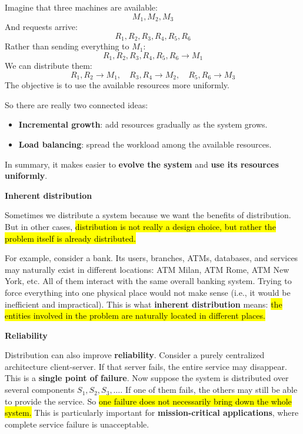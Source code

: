 \highspace
Imagine that three machines are available:
\begin{equation*}
    M_1, M_2, M_3
\end{equation*}
And requests arrive:
\begin{equation*}
    R_1, R_2, R_3, R_4, R_5, R_6
\end{equation*}
Rather than sending everything to $M_1$:
\begin{equation*}
    R_1, R_2, R_3, R_4, R_5, R_6 \to M_1
\end{equation*}
We can distribute them:
\begin{equation*}
    R_1, R_2 \to M_1, \quad R_3, R_4 \to M_2, \quad R_5, R_6 \to M_3
\end{equation*}
The objective is to use the available resources more uniformly.

\highspace
So there are really two connected ideas:
\begin{itemize}
    \item \textbf{Incremental growth}: add resources gradually as the system grows.
    \item \textbf{Load balancing}: spread the workload among the available resources.
\end{itemize}
In summary, it makes easier to \textbf{evolve the system} and \textbf{use its resources uniformly}.

\highspace
\begin{flushleft}
    \textcolor{Green3}{ \textbf{Inherent distribution}}
\end{flushleft}
Sometimes we distribute a system because we want the benefits of distribution. But in other cases, \hl{distribution is not really a design choice, but rather the problem itself is already distributed.}

\highspace
For example, consider a bank. Its users, branches, ATMs, databases, and services may naturally exist in different locations: ATM Milan, ATM Rome, ATM New York, etc. All of them interact with the same overall banking system. Trying to force everything into one physical place would not make sense (i.e., it would be inefficient and impractical). This is what \textbf{inherent distribution} means: \hl{the entities involved in the problem are naturally located in different places.}

\highspace
\begin{flushleft}
    \textcolor{Green3}{ \textbf{Reliability}}
\end{flushleft}
Distribution can also improve \textbf{reliability}. Consider a purely centralized architecture client-server. If that server fails, the entire service may disappear. This is a \textbf{single point of failure}. Now suppose the system is distributed over several components $S_1, S_2, S_3, \dots$. If one of them fails, the others may still be able to provide the service. So \hl{one failure does not necessarily bring down the whole system.} This is particularly important for \textbf{mission-critical applications}, where complete service failure is unacceptable.

